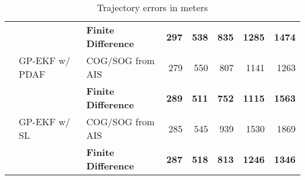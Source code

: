 \begin{table}
\begin{subtable}{\textwidth}
{\begin{tabular}{lllrrrrr}
                        &                & \bf Finite Difference & \bf 297 & \bf 538 & \bf 835  & \bf 1285 & \bf 1474 \\
                        & GP-EKF w/ PDAF & COG/SOG from AIS      & 279     & 550     & 807      & 1141     & 1263     \\
                        &                & \bf Finite Difference & \bf 289 & \bf 511 & \bf 752  & \bf 1115 & \bf 1563 \\
                        & GP-EKF w/ SL   & COG/SOG from AIS      & 285     & 545     & 939      & 1530     & 1869     \\
                        &                & \bf Finite Difference & \bf 287 & \bf 518 & \bf 813  & \bf 1246 & \bf 1346 \\
                \bottomrule
            \end{tabular}
        }
        \caption{Trajectory errors in meters}
        \label{table:stats_straight_traj_err}
        \vspace*{0.5cm}
    \end{subtable}
    \begin{subtable}{\textwidth}
\end{subtable}
\end{table}
